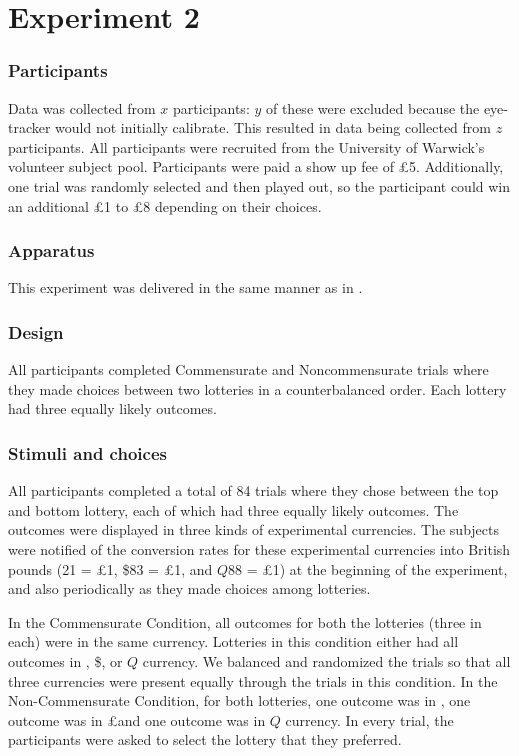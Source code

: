 \documentclass[doc, a4paper, apacite]{apa6}
\def\yenrule{\rule{1.3ex}{.1ex}}
\def\textyen{\renewcommand\stacktype{L}\stackon[.4ex]{\stackon[.65ex]{Y}{\yenrule}}{\yenrule}}
\begin{document}
\section{Experiment 2} \label{exp:NS07}
\subsubsection{Participants}
Data was collected from $x$ participants: $y$ of these were excluded because the eye-tracker would not initially calibrate. This resulted in data being collected from $z$ participants. All participants were recruited from the University of Warwick's volunteer subject pool. Participants were paid a show up fee of \pounds 5. Additionally, one trial was randomly selected and then played out, so the participant could win an additional \pounds 1 to \pounds 8 depending on their choices. 

\subsubsection{Apparatus}
This experiment was delivered in the same manner as in . 

\subsubsection{Design}
All participants completed Commensurate and Noncommensurate trials where they made choices between two lotteries in a counterbalanced order. Each lottery had three equally likely outcomes.

\subsubsection{Stimuli and choices}
All participants completed a total of 84 trials where they chose between the top and bottom lottery, each of which had three equally likely outcomes. The outcomes were displayed in three kinds of experimental currencies. The subjects were notified of the conversion rates for these experimental currencies into British pounds (\textyen 21 = \pounds1, \$83 = \pounds 1, and $Q88$ = \pounds1) at the beginning of the experiment, and also periodically as they made choices among lotteries.
 
In the Commensurate Condition, all outcomes for both the lotteries (three in each) were in the same currency. Lotteries in this condition either had all outcomes in \textyen, \$, or $Q$ currency. We balanced and randomized the trials so that all three currencies were present equally through the trials in this condition. In the Non-Commensurate Condition, for both lotteries, one outcome was in \textyen, one outcome was in \pounds\space and one outcome was in $Q$ currency. In every trial, the participants were asked to select the lottery that they preferred. 
\end{document}
